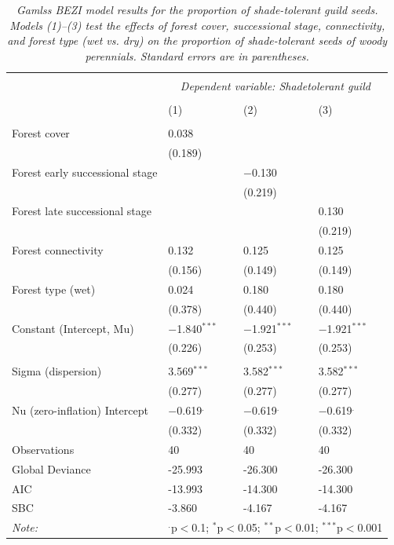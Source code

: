 \begin{table}[H]
\centering
\scriptsize
\caption{\textit{Gamlss BEZI model results for the proportion of shade-tolerant guild seeds. Models (1)–(3) test the effects of forest cover, successional stage, connectivity, and forest type (wet vs. dry) on the proportion of shade-tolerant seeds of woody perennials. Standard errors are in parentheses.}}
\begin{tabularx}{\textwidth}{@{\extracolsep{3pt}}lXXX} 
\\[-1ex]\hline 
\hline \\[-1ex] 
 & \multicolumn{3}{c}{\textit{Dependent variable: Shadetolerant guild}} \\ 
\\[-1ex] & (1) & (2) & (3)\\ 
\hline \\[-0.8ex] 
Forest cover & 0.038 &  &  \\ 
 & (0.189) &  &  \\ 
Forest early successional stage &  & $-$0.130 &  \\ 
 &  & (0.219) &  \\ 
Forest late successional stage &  &  & 0.130 \\ 
 &  &  & (0.219) \\ 
Forest connectivity & 0.132 & 0.125 & 0.125 \\ 
 & (0.156) & (0.149) & (0.149) \\ 
Forest type (wet) & 0.024 & 0.180 & 0.180 \\ 
 & (0.378) & (0.440) & (0.440) \\ 
Constant (Intercept, Mu) & $-$1.840$^{***}$ & $-$1.921$^{***}$ & $-$1.921$^{***}$ \\ 
 & (0.226) & (0.253) & (0.253) \\ 
\hline \\[-0.8ex] 
Sigma (dispersion) & 3.569$^{***}$ & 3.582$^{***}$ & 3.582$^{***}$ \\
 & (0.277) & (0.277) & (0.277) \\
Nu (zero-inflation) Intercept & $-$0.619$^{.}$ & $-$0.619$^{.}$ & $-$0.619$^{.}$ \\
 & (0.332) & (0.332) & (0.332) \\
Observations & 40 & 40 & 40 \\ 
Global Deviance & -25.993 & -26.300 & -26.300 \\ 
AIC & -13.993 & -14.300 & -14.300 \\ 
SBC & -3.860 & -4.167 & -4.167 \\ 
\hline 
\textit{Note:} & \multicolumn{3}{r}{$^{.}$p$<$0.1; $^{*}$p$<$0.05; $^{**}$p$<$0.01; $^{***}$p$<$0.001} \\ 
\end{tabularx} 
\label{tab:shadetolerant_gamlss}
\end{table}

